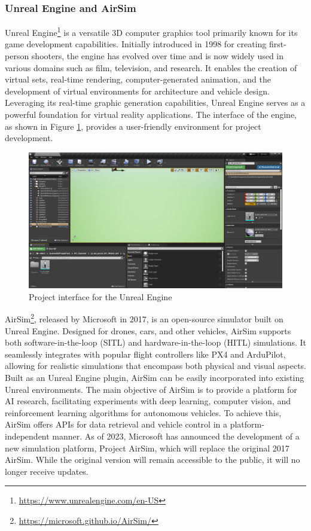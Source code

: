 \subsubsection{Unreal Engine and AirSim}
\label{subsec:unreal}

Unreal Engine\footnote{\url{https://www.unrealengine.com/en-US}} is a versatile 3D computer graphics tool primarily known for its game development capabilities. Initially introduced in 1998 for creating first-person shooters, the engine has evolved over time and is now widely used in various domains such as film, television, and research. It enables the creation of virtual sets, real-time rendering, computer-generated animation, and the development of virtual environments for architecture and vehicle design. Leveraging its real-time graphic generation capabilities, Unreal Engine serves as a powerful foundation for virtual reality applications. The interface of the engine, as shown in Figure \ref{fig:ue-interface}, provides a user-friendly environment for project development.

\begin{figure}
  \centering
  \includegraphics[width=\textwidth,keepaspectratio]{img/ue-interface.png}
  \caption{Project interface for the Unreal Engine}\label{fig:ue-interface}
\end{figure}


AirSim\footnote{\url{https://microsoft.github.io/AirSim/}}, released by Microsoft in 2017, is an open-source simulator built on Unreal Engine. Designed for drones, cars, and other vehicles, AirSim supports both software-in-the-loop (SITL) and hardware-in-the-loop (HITL) simulations. It seamlessly integrates with popular flight controllers like PX4 and ArduPilot, allowing for realistic simulations that encompass both physical and visual aspects. Built as an Unreal Engine plugin, AirSim can be easily incorporated into existing Unreal environments. The main objective of AirSim is to provide a platform for AI research, facilitating experiments with deep learning, computer vision, and reinforcement learning algorithms for autonomous vehicles. To achieve this, AirSim offers APIs for data retrieval and vehicle control in a platform-independent manner. As of 2023, Microsoft has announced the development of a new simulation platform, Project AirSim, which will replace the original 2017 AirSim. While the original version will remain accessible to the public, it will no longer receive updates.


